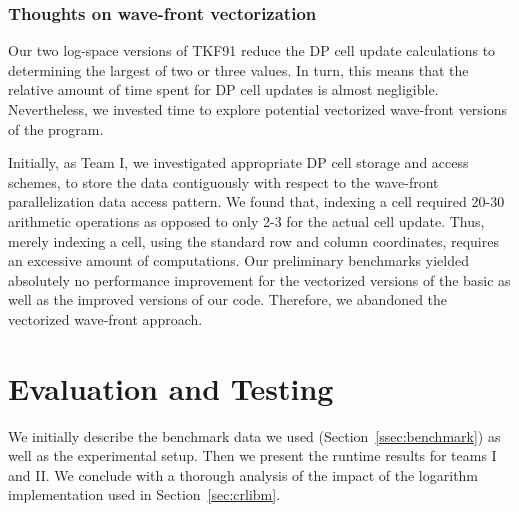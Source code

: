 \documentclass[runningheads,a4paper]{llncs}
\begin{document}
\subsubsection{Thoughts on wave-front vectorization}


Our two log-space versions of TKF91 reduce the DP cell update calculations to determining the largest of two or three values. 
In turn, this means that the relative amount of time spent for DP cell updates is almost negligible. 
Nevertheless, we invested time to explore potential vectorized wave-front versions of the program.

Initially, as Team I, we investigated appropriate DP cell storage and access schemes, 
to store the data contiguously with respect to the wave-front parallelization data access pattern.
We found that, indexing a cell required 20-30 arithmetic operations as opposed to only 2-3 for the actual cell update.
Thus, merely indexing a cell, using the standard row and column coordinates, requires an excessive amount of computations. 
Our preliminary benchmarks yielded absolutely no performance improvement for the vectorized versions of 
the basic as well as the improved versions of our code.
Therefore, we abandoned the vectorized wave-front approach.


\section{Evaluation and Testing}
\label{sec:evaluation}

We initially describe the benchmark data we used (Section~\ref{ssec:benchmark}) as well as the experimental setup.
Then we present the runtime results for teams I and II. We conclude with a thorough analysis of the impact of the logarithm implementation used 
in Section~\ref{sec:crlibm}.
\end{document}
